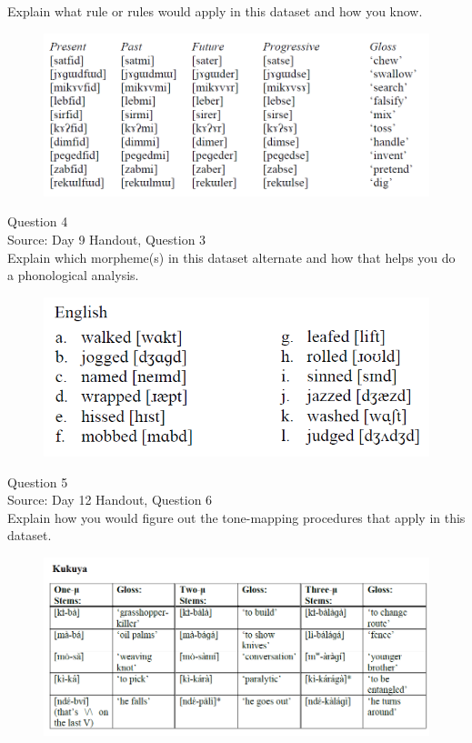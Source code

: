 \documentclass[12pt]{article}
\begin{document}
Explain what rule or rules would apply in this dataset and how you know.\\

\begin{figure}[H]
\includegraphics{../images/final_dataset.png}
\end{figure}

\newpage

{\large Question 4}\\

Source: Day 9 Handout, Question 3\\

Explain which morpheme(s) in this dataset alternate and how that helps you do a phonological analysis.\\

\begin{figure}[H]
\includegraphics{../images/english_past.png}
\end{figure}

\newpage

{\large Question 5}\\

Source: Day 12 Handout, Question 6\\

Explain how you would figure out the tone-mapping procedures that apply in this dataset.\\

\begin{figure}[H]
\includegraphics{../images/kukuya.png}
\end{figure}
\end{document}
